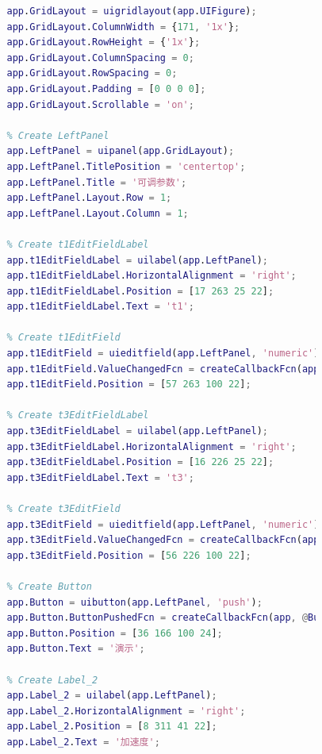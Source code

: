\documentclass[withoutpreface,bwprint]{cumcmthesis} %
\begin{document}
\begin{appendices}
\begin{lstlisting}[language=matlab]
                % Create GridLayout
                app.GridLayout = uigridlayout(app.UIFigure);
                app.GridLayout.ColumnWidth = {171, '1x'};
                app.GridLayout.RowHeight = {'1x'};
                app.GridLayout.ColumnSpacing = 0;
                app.GridLayout.RowSpacing = 0;
                app.GridLayout.Padding = [0 0 0 0];
                app.GridLayout.Scrollable = 'on';
    
                % Create LeftPanel
                app.LeftPanel = uipanel(app.GridLayout);
                app.LeftPanel.TitlePosition = 'centertop';
                app.LeftPanel.Title = '可调参数';
                app.LeftPanel.Layout.Row = 1;
                app.LeftPanel.Layout.Column = 1;
    
                % Create t1EditFieldLabel
                app.t1EditFieldLabel = uilabel(app.LeftPanel);
                app.t1EditFieldLabel.HorizontalAlignment = 'right';
                app.t1EditFieldLabel.Position = [17 263 25 22];
                app.t1EditFieldLabel.Text = 't1';
    
                % Create t1EditField
                app.t1EditField = uieditfield(app.LeftPanel, 'numeric');
                app.t1EditField.ValueChangedFcn = createCallbackFcn(app, @t1EditFieldValueChanged, true);
                app.t1EditField.Position = [57 263 100 22];
    
                % Create t3EditFieldLabel
                app.t3EditFieldLabel = uilabel(app.LeftPanel);
                app.t3EditFieldLabel.HorizontalAlignment = 'right';
                app.t3EditFieldLabel.Position = [16 226 25 22];
                app.t3EditFieldLabel.Text = 't3';
    
                % Create t3EditField
                app.t3EditField = uieditfield(app.LeftPanel, 'numeric');
                app.t3EditField.ValueChangedFcn = createCallbackFcn(app, @t3EditFieldValueChanged, true);
                app.t3EditField.Position = [56 226 100 22];
    
                % Create Button
                app.Button = uibutton(app.LeftPanel, 'push');
                app.Button.ButtonPushedFcn = createCallbackFcn(app, @ButtonPushed, true);
                app.Button.Position = [36 166 100 24];
                app.Button.Text = '演示';
    
                % Create Label_2
                app.Label_2 = uilabel(app.LeftPanel);
                app.Label_2.HorizontalAlignment = 'right';
                app.Label_2.Position = [8 311 41 22];
                app.Label_2.Text = '加速度';
    

\end{lstlisting}
\end{appendices}
\end{document}
